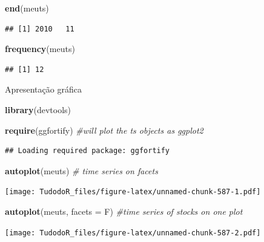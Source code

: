 \documentclass[
]{book}
\newenvironment{Shaded}{\begin{snugshade}}{\end{snugshade}}
\newcommand{\CommentTok}[1]{\textcolor[rgb]{0.56,0.35,0.01}{\textit{#1}}}
\newcommand{\DataTypeTok}[1]{\textcolor[rgb]{0.13,0.29,0.53}{#1}}
\newcommand{\KeywordTok}[1]{\textcolor[rgb]{0.13,0.29,0.53}{\textbf{#1}}}
\newcommand{\NormalTok}[1]{#1}
\begin{document}
\begin{Shaded}
\begin{Highlighting}[]
\KeywordTok{end}\NormalTok{(meuts)}
\end{Highlighting}
\end{Shaded}

\begin{verbatim}
## [1] 2010   11
\end{verbatim}

\begin{Shaded}
\begin{Highlighting}[]
\KeywordTok{frequency}\NormalTok{(meuts)}
\end{Highlighting}
\end{Shaded}

\begin{verbatim}
## [1] 12
\end{verbatim}

Apresentação gráfica

\begin{Shaded}
\begin{Highlighting}[]
\KeywordTok{library}\NormalTok{(devtools)}

\KeywordTok{require}\NormalTok{(ggfortify) }\CommentTok{#will plot the ts objects as ggplot2}
\end{Highlighting}
\end{Shaded}

\begin{verbatim}
## Loading required package: ggfortify
\end{verbatim}

\begin{Shaded}
\begin{Highlighting}[]
\KeywordTok{autoplot}\NormalTok{(meuts) }\CommentTok{# time series on facets}
\end{Highlighting}
\end{Shaded}

\texttt{[image: TudodoR\_files/figure-latex/unnamed-chunk-587-1.pdf]}

\begin{Shaded}
\begin{Highlighting}[]
\KeywordTok{autoplot}\NormalTok{(meuts, }\DataTypeTok{facets =}\NormalTok{ F) }\CommentTok{#time series of stocks on one plot}
\end{Highlighting}
\end{Shaded}

\texttt{[image: TudodoR\_files/figure-latex/unnamed-chunk-587-2.pdf]}
\end{document}
